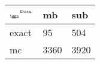 \begin{tabular}{lll}
    \toprule
    $_{\text{\tiny{\ggn}}}$$^{\text{\tiny{Data}}}$ & mb & sub \\
    \midrule
    exact & 95
              & 504 \\
    mc   & 3360
              & 3920 \\
    \bottomrule
\end{tabular}